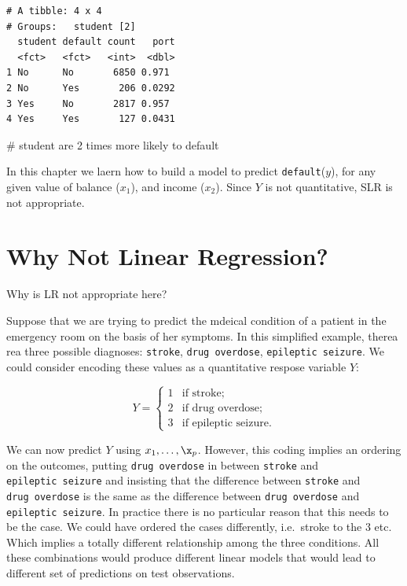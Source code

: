 \documentclass[
  letterpaper,
  DIV=11,
  numbers=noendperiod]{scrreprt}
\newenvironment{Shaded}{\begin{snugshade}}{\end{snugshade}}
\newcommand{\CommentTok}[1]{\textcolor[rgb]{0.41,0.41,0.41}{#1}}
\begin{document}
\begin{verbatim}
# A tibble: 4 x 4
# Groups:   student [2]
  student default count   port
  <fct>   <fct>   <int>  <dbl>
1 No      No       6850 0.971 
2 No      Yes       206 0.0292
3 Yes     No       2817 0.957 
4 Yes     Yes       127 0.0431
\end{verbatim}

\begin{Shaded}
\begin{Highlighting}[]
\CommentTok{\# student are 2 times more likely to default}
\end{Highlighting}
\end{Shaded}

In this chapter we laern how to build a model to predict
\texttt{default}(\(y\)), for any given value of balance (\(x_1\)), and
income (\(x_2\)). Since \(Y\) is not quantitative, SLR is not
appropriate.

\hypertarget{why-not-linear-regression}{%
\section{Why Not Linear Regression?}\label{why-not-linear-regression}}

Why is LR not appropriate here?

Suppose that we are trying to predict the mdeical condition of a patient
in the emergency room on the basis of her symptoms. In this simplified
example, therea rea three possible diagnoses: \texttt{stroke},
\texttt{drug\ overdose}, \texttt{epileptic\ seizure}. We could consider
encoding these values as a quantitative respose variable \(Y\):

\[
Y = 
\begin{cases}
1 & \text{if stroke}; \\
2 & \text{if drug overdose}; \\
3 & \text{if epileptic seizure}.
\end{cases}
\]

We can now predict \(Y\) using \(x_1, \dots, \x_p\). However, this
coding implies an ordering on the outcomes, putting
\texttt{drug\ overdose} in between \texttt{stroke} and
\texttt{epileptic\ seizure} and insisting that the difference between
\texttt{stroke} and \texttt{drug\ overdose} is the same as the
difference between \texttt{drug\ overdose} and
\texttt{epileptic\ seizure}. In practice there is no particular reason
that this needs to be the case. We could have ordered the cases
differently, i.e.~stroke to the 3 etc. Which implies a totally different
relationship among the three conditions. All these combinations would
produce different linear models that would lead to different set of
predictions on test observations.
\end{document}
